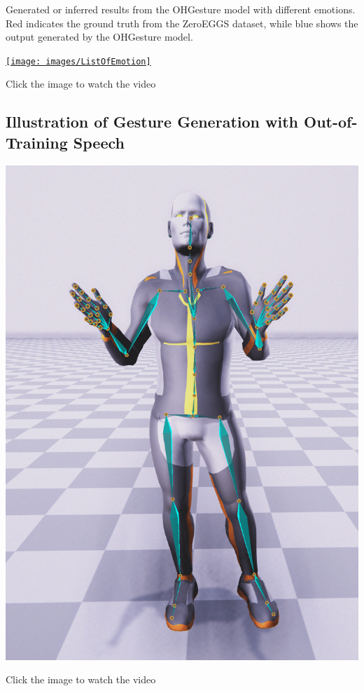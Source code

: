 Generated or inferred results from the OHGesture model with different emotions. Red indicates the ground truth from the ZeroEGGS dataset, while blue shows the output generated by the OHGesture model.

{
	\begin{center}
		\centering
		\href{https://youtu.be/eZghfNGmZn8}{%
			\texttt{[image: images/ListOfEmotion]}}
		
		{\tiny Click the image to watch the video}
	\end{center}
}

\subsection{Illustration of Gesture Generation with Out-of-Training Speech}

{
	\begin{center}
		\centering
		\href{https://www.youtube.com/watch?v=B6nv1kQmi-Q}{%
			\includegraphics[width=0.8\linewidth]{images/StevenJob}}
		
		{\tiny Click the image to watch the video}
	\end{center}
}


